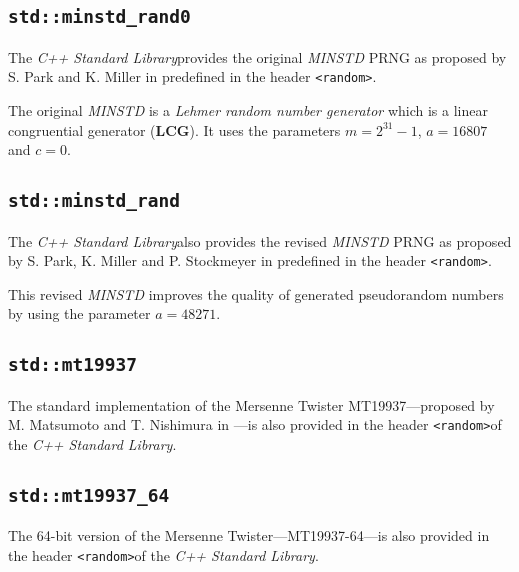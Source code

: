 \subsection[\lstinline{std::minstd_rand0}]{\lstinline{std::minstd_rand0}} \label{subsec:minstd_rand0}

    The \textit{C++ Standard Library}\footnotemark[1] provides the original \textit{MINSTD} PRNG as proposed by S. Park and K. Miller in \cite{Park:1988} predefined in the header \lstinline{<random>}\footnotemark[2].

    The original \textit{MINSTD} is a \emph{Lehmer random number generator} which is a linear congruential generator (\textbf{LCG}). It uses the parameters $m = 2^31 - 1$, $a = 16807$ and $c = 0$.

\subsection[\lstinline{std::minstd_rand}]{\lstinline{std::minstd_rand}} \label{subsec:minstd_rand}

    The \textit{C++ Standard Library}\footnotemark[1] also provides the revised \textit{MINSTD} PRNG as proposed by S. Park, K. Miller and P. Stockmeyer in \cite{Park:1993} predefined in the header \lstinline{<random>}\footnotemark[2].

    This revised \textit{MINSTD} improves the quality of generated pseudorandom numbers by using the parameter $a = 48271$.

\subsection[\lstinline{std::mt19937}]{\lstinline{std::mt19937}} \label{subsec:mt19937}

    The standard implementation of the Mersenne Twister MT19937---proposed by M. Matsumoto and T. Nishimura in \cite{Matsumoto:1998}---is also provided in the header \lstinline{<random>}\footnotemark[2] of the \textit{C++ Standard Library}\footnotemark[1].

\subsection[\lstinline{std::mt19937_64}]{\lstinline{std::mt19937_64}} \label{subsec:mt19937_64}

    The 64-bit version of the Mersenne Twister---MT19937-64---is also provided in the header \lstinline{<random>}\footnotemark[2] of the \textit{C++ Standard Library}\footnotemark[1].

